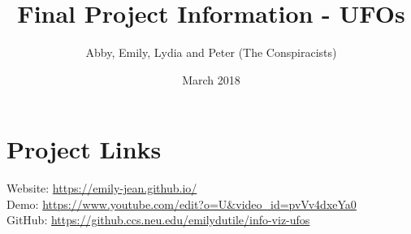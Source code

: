 \documentclass{neu_handout}
\title{Final Project Information - UFOs}
\author{Abby, Emily, Lydia and Peter (The Conspiracists)}
\date{March 2018}
\begin{document}
\section*{Project Links}

Website:  \url{https://emily-jean.github.io/ } \\

Demo:  \url{https://www.youtube.com/edit?o=U&video_id=pvVv4dxeYa0 } \\

GitHub: \url{https://github.ccs.neu.edu/emilydutile/info-viz-ufos} \\
 
\end{document}
